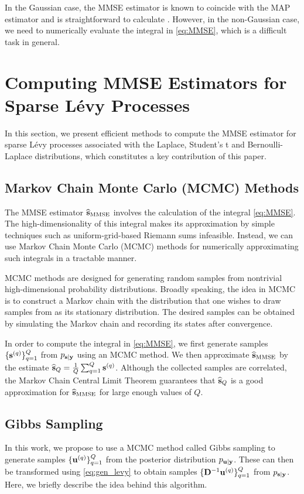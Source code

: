 \documentclass[journal]{IEEEtran}
\begin{document}
In the Gaussian case, the MMSE estimator is known to coincide with the MAP estimator and is straightforward to calculate \cite{kay1993fundamentals,unser2019biomedical}. However, in the non-Gaussian case, we need to numerically evaluate the integral in \eqref{eq:MMSE}, which is a difficult task in general.


\section{Computing MMSE Estimators for Sparse L\'{e}vy Processes}
In this section, we present efficient methods to compute the MMSE estimator for sparse L\'{e}vy processes associated with the Laplace, Student's t and Bernoulli-Laplace distributions, which constitutes a key contribution of this paper.

\subsection{Markov Chain Monte Carlo (MCMC) Methods}
The MMSE estimator $\widehat{{\bf{s}}}_{\text{MMSE}}$ involves the calculation of the integral \eqref{eq:MMSE}. The high-dimensionality of this integral makes its approximation by simple techniques such as uniform-grid-based Riemann sums infeasible. Instead, we can use Markov Chain Monte Carlo (MCMC) methods \cite{hastings1970monte, geyer1992practical,gilks1995markov,gamerman2006markov} for numerically approximating such integrals in a tractable manner.

MCMC methods are designed for generating random samples from nontrivial high-dimensional probability distributions. Broadly speaking, the idea in MCMC is to construct a Markov chain with the distribution that one wishes to draw samples from as its stationary distribution. The desired samples can be obtained by simulating the Markov chain and recording its states after convergence.

In order to compute the integral in \eqref{eq:MMSE}, we first generate samples $\{{\bf{s}}^{(q)}\}_{q=1}^{Q}$ from $p_{{\bf{s}} | {\bf{y}}}$ using an MCMC method. We then approximate $\widehat{{\bf{s}}}_{\text{MMSE}}$ by the estimate $\widehat{{\bf{s}}}_{Q} = \frac{1}{Q} \sum_{q=1}^{Q} {\bf{s}}^{(q)}$. Although the collected samples are correlated, the Markov Chain Central Limit Theorem \cite{gordin1978central} guarantees that $\widehat{{\bf{s}}}_{Q}$ is a good approximation for $\widehat{{\bf{s}}}_{\text{MMSE}}$ for large enough values of $Q$.


\subsection{Gibbs Sampling}
In this work, we propose to use a MCMC method called Gibbs sampling \cite{geman1984stochastic,casella1992explaining} to generate samples $\{{\bf{u}}^{(q)}\}_{q=1}^{Q}$ from the posterior distribution $p_{{\bf{u}} | {\bf{y}}}$. These can then be transformed using \eqref{eq:gen_levy} to obtain samples $\{{\bf{D}}^{-1} {\bf{u}}^{(q)}\}_{q=1}^{Q}$ from $p_{{\bf{s}} | {\bf{y}}}$. Here, we briefly describe the idea behind this algorithm.
\end{document}
